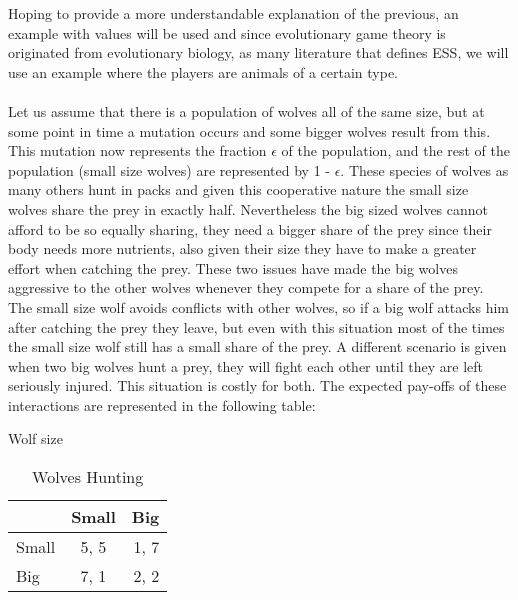 \documentclass{book}
\begin{document}
Hoping to provide a more understandable explanation of the previous, an example with values will be used and since evolutionary game theory is originated from evolutionary biology, as many literature that defines ESS, we will use an example where the players are animals of a certain type.
\\\\Let us assume that there is a population of wolves all of the same size, but at some point in time a mutation occurs and some bigger wolves result from this. This mutation now represents the fraction $\epsilon$ of the population, and the rest of the population (small size wolves) are represented by 1 - $\epsilon$. These species of wolves as many others hunt in packs and given this cooperative nature the small size wolves share the prey in exactly half. Nevertheless the big sized wolves cannot afford to be so equally sharing, they need a bigger share of the prey since their body needs more nutrients, also given their size they have to make a greater effort when catching the prey. These two issues have made the big wolves aggressive to the other wolves whenever they compete for a share of the prey. The small size wolf avoids conflicts with other wolves, so if a big wolf attacks him after catching the prey they leave, but even with this situation most of the times the small size wolf still has a small share of the prey. A different scenario is given when two big wolves hunt a prey, they will fight each other until they are left seriously injured. This situation is costly for both. The expected pay-offs of these interactions are represented in the following table:

\begin{table}[h]
\begin{center}
Wolf size


\begin{tabular}{|l|c|r|}
\hline
 & Small & Big \\ 
\hline
Small & 5, 5 & 1, 7\\
\hline
 Big & 7, 1 & 2, 2\\
\hline
\end{tabular}
\caption{Wolves Hunting}
\label{tab:wolveshunt}
\end{center}
\end{table}
\end{document}
